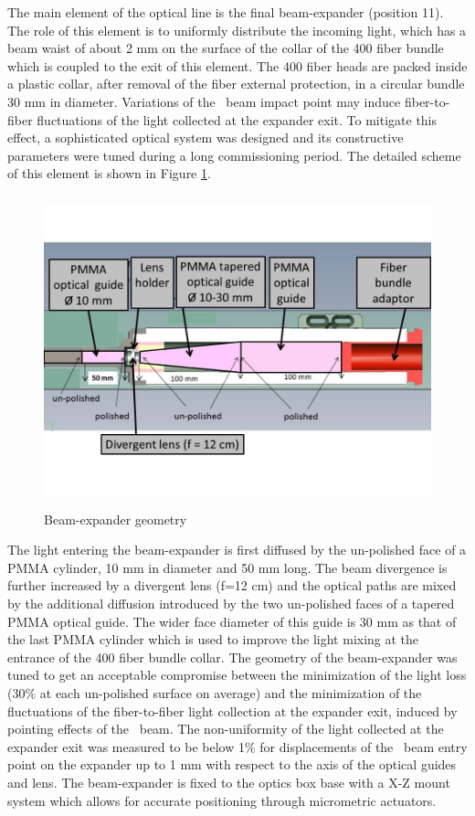 The main element of the optical line is the final beam-expander (position 11). The
role of this element is to uniformly distribute the incoming light, which has a
beam waist of about 2 mm on the surface of the collar of the 400 fiber bundle which
is coupled to the exit of this element. The 400 fiber heads are packed inside a
plastic collar, after removal of the fiber external protection, in a circular bundle
30 mm in diameter. Variations of the \laser~beam impact point may induce fiber-to-fiber fluctuations of the light collected at the expander exit. To mitigate this effect, a sophisticated optical system was designed and its constructive parameters were tuned
during a long commissioning period.  The detailed scheme of this element is shown in
Figure \ref{fig:x.4}.
% 
\begin{figure}[htb]
\begin{center} 
\includegraphics[width=13cm, height=9cm]{figures/Beam_expander}
\caption{Beam-expander geometry
}\label{fig:x.4}
\end{center}
\end{figure}
%

The light entering the beam-expander is first diffused by the un-polished face of a
PMMA cylinder, 10 mm in diameter and 50 mm long. The beam divergence is further
increased by a divergent lens (f=12 cm) and the optical paths are mixed by the
additional diffusion introduced by the two un-polished faces of a tapered PMMA
optical guide. The wider face diameter of this guide is 30 mm as that of the last
PMMA cylinder which is used to improve the light mixing at
the entrance of the 400 fiber bundle collar. The geometry of the beam-expander was
tuned to get an acceptable compromise between the minimization
of the light loss (30$\%$ at each un-polished surface on average) and the
minimization of the fluctuations of the fiber-to-fiber light collection at the
expander exit, induced by pointing effects of the \laser~beam. The non-uniformity of
the light collected at the expander exit was measured to be below 1$\%$ for
displacements of the \laser~beam entry point on the expander up to 1 mm with respect
to the axis of the optical guides and lens. The beam-expander is fixed to the optics
box base with a X-Z mount system which allows for accurate positioning through
micrometric actuators.


